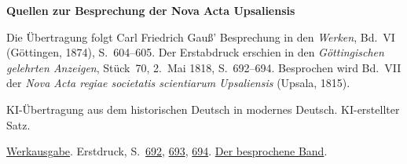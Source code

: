 \clearpage\thispagestyle{empty}
\begin{center}\Large\bfseries Quellen zur Besprechung der Nova Acta Upsaliensis\end{center}

Die Übertragung folgt Carl Friedrich Gauß’ Besprechung in den \emph{Werken}, Bd.~VI (Göttingen, 1874), S.~604--605. Der Erstabdruck erschien in den \emph{Göttingischen gelehrten Anzeigen}, Stück~70, 2.~Mai 1818, S.~692--694. Besprochen wird Bd.~VII der \emph{Nova Acta regiae societatis scientiarum Upsaliensis} (Upsala, 1815).

KI-Übertragung aus dem historischen Deutsch in modernes Deutsch. KI-erstellter Satz.

\href{https://gdz.sub.uni-goettingen.de/id/PPN236007467}{Werkausgabe}. Erstdruck, S.~\href{https://images.p.sub.uni-goettingen.de/iiif/image/gdz:PPN319721507_1818:00000700/full/1650,/0/default.jpg}{692}, \href{https://images.p.sub.uni-goettingen.de/iiif/image/gdz:PPN319721507_1818:00000701/full/1650,/0/default.jpg}{693}, \href{https://images.p.sub.uni-goettingen.de/iiif/image/gdz:PPN319721507_1818:00000702/full/1650,/0/default.jpg}{694}. \href{https://play.google.com/store/books/details/Nova_acta_regiae_societatis_scientiarum_upsaliensi?id=QakWAAAAQAAJ}{Der besprochene Band}.

\clearpage
